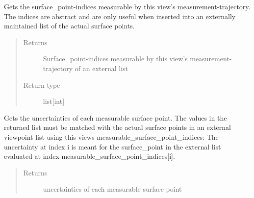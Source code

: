 \documentclass[letterpaper,10pt,english]{sphinxmanual}
\begin{document}
\begin{fulllineitems}
\begin{fulllineitems}
\begin{quote}
\begin{description}
\end{description}\end{quote}

\end{fulllineitems}


\begin{fulllineitems}
\label{\detokenize{module_view:agiprobot_measurement.viewpoint.ViewPoint.get_measurable_surface_point_indices}}
Gets the surface\_point-indices measurable by this view’s measurement-trajectory. The indices are abstract and are only useful 
when inserted into an externally maintained list of the actual surface points.
\begin{quote}\begin{description}
\item[{Returns}] \leavevmode
Surface\_point-indices measurable by this view’s measurement-trajectory of an external list

\item[{Return type}] \leavevmode
list{[}int{]}

\end{description}\end{quote}

\end{fulllineitems}


\begin{fulllineitems}
\label{\detokenize{module_view:agiprobot_measurement.viewpoint.ViewPoint.get_measurable_surface_point_uncertainties}}
Gets the uncertainties of each measurable surface point. The values in the returned list must be matched with the
actual surface points in an external viewpoint list using this views measurable\_surface\_point\_indices: The uncertainty at index i
is meant for the surface\_point in the external list evaluated at index measurable\_surface\_point\_indices{[}i{]}.
\begin{quote}\begin{description}
\item[{Returns}] \leavevmode
uncertainties of each measurable surface point


\end{description}
\end{quote}
\end{fulllineitems}
\end{fulllineitems}
\end{document}

